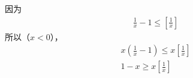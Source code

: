 \documentclass{article}
\begin{document}
\begin{itemize}
        因为
        \begin{align*}
          \frac{1}{x} - 1 \leq \left[\frac{1}{x}\right]
        \end{align*}
        所以（$x < 0$），
        \begin{align*}
          x(\frac{1}{x} - 1) \leq x \left[\frac{1}{x}\right] \\
          1 - x \geq x \left[\frac{1}{x}\right]
        \end{align*}

\end{itemize}
\end{document}
